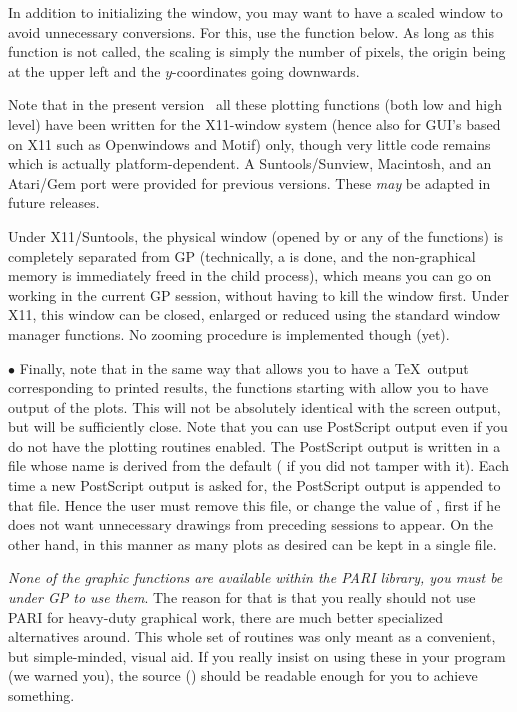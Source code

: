    In addition to initializing the window, you may want to have a scaled
window to avoid unnecessary conversions. For this, use the function
 below. As long as this function is not called, the scaling is
simply the number of pixels, the origin being at the upper left and the
$y$-coordinates going downwards.

   Note that in the present version \vers\ all these plotting functions
(both low and high level) have been written for the X11-window system
(hence also for GUI's based on X11 such as Openwindows and Motif) only,
though very little code remains which is actually platform-dependent. A
Suntools/Sunview, Macintosh, and an Atari/Gem port were provided for
previous versions. These \emph{may} be adapted in future releases.

   Under X11/Suntools, the physical window (opened by  or any
of the  functions) is completely separated from GP (technically,
a  is done, and the non-graphical memory is immediately freed in
the child process), which means you can go on working in the current GP
session, without having to kill the window first. Under X11, this window can
be closed, enlarged or reduced using the standard window manager functions.
No zooming procedure is implemented though (yet).

$\bullet$ Finally, note that in the same way that  allows you
to have a \TeX\ output corresponding to printed results, the functions
starting with  allow you to have  output of the
plots. This will not be absolutely identical with the screen output, but will
be sufficiently close. Note that you can use PostScript output even if you do
not have the plotting routines enabled. The PostScript output is written in a
file whose name is derived from the  default ( if
you did not tamper with it). Each time a new PostScript output is asked for,
the PostScript output is appended to that file. Hence the user must remove
this file, or change the value of , first if he does not want
unnecessary drawings from preceding sessions to appear. On the other hand, in
this manner as many plots as desired can be kept in a single file. \smallskip

\emph{None of the graphic functions are available within the PARI library, you
must be under GP to use them}. The reason for that is that you really should
not use PARI for heavy-duty graphical work, there are much better specialized
alternatives around. This whole set of routines was only meant as a
convenient, but simple-minded, visual aid. If you really insist on using
these in your program (we warned you), the source () should be
readable enough for you to achieve something.

